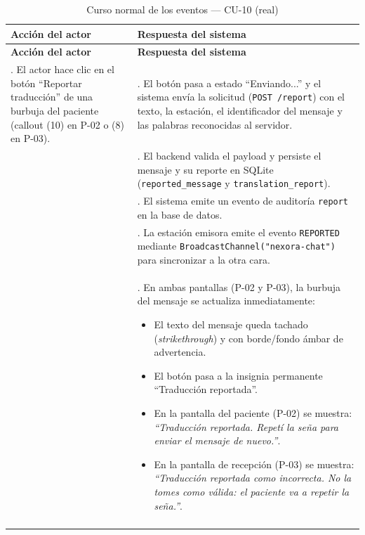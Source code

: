 \setlength{\extrarowheight}{5pt}
\begin{longtable}{@{}>{\raggedright\arraybackslash}p{} >{\raggedright\arraybackslash}p{}@{}}
\toprule
\textbf{Acción del actor} & \textbf{Respuesta del sistema} \\
\midrule
\endfirsthead
\toprule
\textbf{Acción del actor} & \textbf{Respuesta del sistema} \\
\midrule
\endhead
1. El actor hace clic en el botón ``Reportar traducción'' de una burbuja
del paciente (callout (10) en P-02 o (8) en P-03). &
2. El botón pasa a estado ``Enviando...'' y el sistema envía la solicitud
(\texttt{POST /report}) con el texto, la estación, el identificador del
mensaje y las palabras reconocidas al servidor. \\
&
3. El backend valida el payload y persiste el mensaje y su reporte en
SQLite (\texttt{reported\_message} y \texttt{translation\_report}). \\
&
4. El sistema emite un evento de auditoría \texttt{report} en la base de
datos. \\
&
5. La estación emisora emite el evento \texttt{REPORTED} mediante
\texttt{BroadcastChannel("nexora-chat")} para sincronizar a la otra cara. \\
&
6. En ambas pantallas (P-02 y P-03), la burbuja del mensaje se actualiza
inmediatamente:
\begin{itemize}[leftmargin=*, itemsep=2pt]
    \item El texto del mensaje queda tachado (\textit{strikethrough}) y con
    borde/fondo ámbar de advertencia.
    \item El botón pasa a la insignia permanente ``Traducción reportada''.
    \item En la pantalla del paciente (P-02) se muestra: \textit{``Traducción
    reportada. Repetí la seña para enviar el mensaje de nuevo.''}.
    \item En la pantalla de recepción (P-03) se muestra: \textit{``Traducción
    reportada como incorrecta. No la tomes como válida: el paciente va a
    repetir la seña.''}.
\end{itemize} \\
\bottomrule
\caption{Curso normal de los eventos --- CU-10 (real)}
\end{longtable}
\setlength{\extrarowheight}{0pt}

